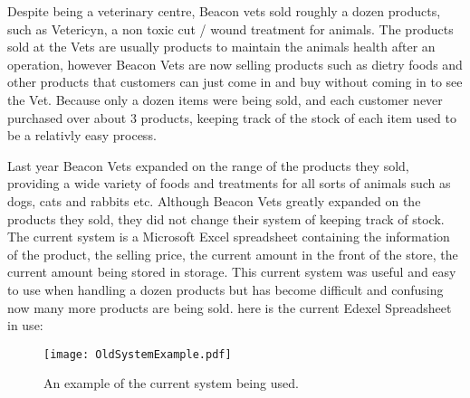 \begin{flushleft}
Despite being a veterinary centre, Beacon vets sold roughly a dozen products, such as Vetericyn, a non toxic cut / wound treatment for animals. The products sold at the Vets are usually products to maintain the animals health after an operation, however Beacon Vets are now selling products such as dietry foods and other products that customers can just come in and buy without coming  in to see the Vet. Because only a dozen items were being sold, and each customer never purchased over about 3 products, keeping track of the stock of each item used to be a relativly easy process. \par

Last year Beacon Vets expanded on the range of the products they sold, providing a wide variety of foods and treatments for all sorts of animals such as dogs, cats and rabbits etc. Although Beacon Vets greatly expanded on the products they sold, they did not change their system of keeping track of stock. The current system is a Microsoft Excel spreadsheet containing the information of the product, the selling price, the current amount in the front of the store, the current amount being stored in storage. This current system was useful and easy to use when handling a dozen products but has become difficult and confusing now many more products are being sold. here is the current Edexel Spreadsheet in use:\par
\end{flushleft}


\begin{figure}[H]

\hfill\texttt{[image: OldSystemExample.pdf]}\hspace*{\fill}
\caption{An example of the current system being used.} \label{fig:Example Of Old System}
\end{figure}

